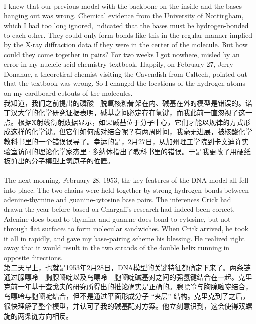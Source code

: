 \documentclass{article}
\begin{document}
\\
I knew that our previous model with the backbone on the inside and the bases hanging out was wrong. Chemical evidence from the University of Nottingham, which I had too long ignored, indicated that the bases must be hydrogen-bonded to each other. They could only form bonds like this in the regular manner implied by the X-ray diffraction data if they were in the center of the molecule. But how could they come together in pairs? For two weeks I got nowhere, misled by an error in my nucleic acid chemistry textbook. Happily, on February 27, Jerry Donahue, a theoretical chemist visiting the Cavendish from Caltech, pointed out that the textbook was wrong. So I changed the locations of the hydrogen atoms on my cardboard cutouts of the molecules.\\
我知道，我们之前提出的磷酸 - 脱氧核糖骨架在内、碱基在外的模型是错误的。诺丁汉大学的化学研究证据表明，碱基之间必定存在氢键，而我此前一直忽视了这一点。根据X射线衍射数据显示，如果碱基位于分子中心，它们才能以规律的方式形成这样的化学键。但它们如何成对结合呢？有两周时间，我毫无进展，被核酸化学教科书里的一个错误误导了。幸运的是，2月27日，从加州理工学院到卡文迪许实验室访问的理论化学家杰里·多纳休指出了教科书里的错误。于是我更改了用硬纸板剪出的分子模型上氢原子的位置。 \\

\\
The next morning, February 28, 1953, the key features of the DNA model all fell into place. The two chains were held together by strong hydrogen bonds between adenine-thymine and guanine-cytosine base pairs. The inferences Crick had drawn the year before based on Chargaff’s research had indeed been correct. Adenine does bond to thymine and guanine does bond to cytosine, but not through flat surfaces to form molecular sandwiches. When Crick arrived, he took it all in rapidly, and gave my base-pairing scheme his blessing. He realized right away that it would result in the two strands of the double helix running in opposite directions.\\
第二天早上，也就是1953年2月28日，DNA模型的关键特征都确定下来了。两条链通过腺嘌呤 - 胸腺嘧啶以及鸟嘌呤 - 胞嘧啶碱基对之间的强氢键结合在一起。克里克前一年基于查戈夫的研究所得出的推论确实是正确的。腺嘌呤与胸腺嘧啶结合，鸟嘌呤与胞嘧啶结合，但不是通过平面形成分子 “夹层” 结构。克里克到了之后，很快理解了整个模型，并认可了我的碱基配对方案。他立刻意识到，这会使得双螺旋的两条链方向相反。 \\
\end{document}
